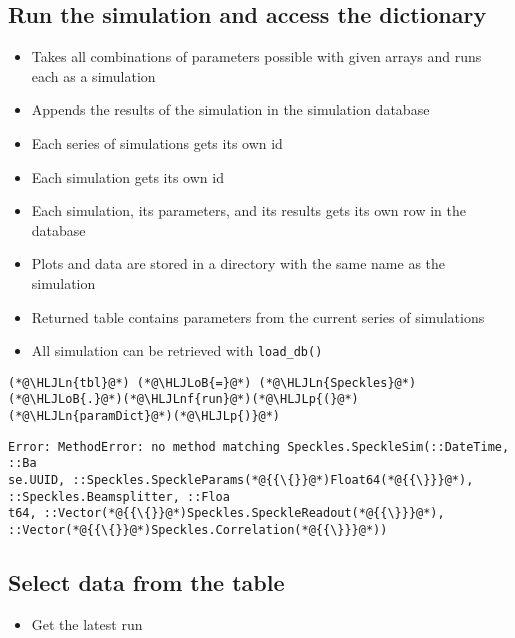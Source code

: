 \documentclass[12pt,a4paper]{article}
\newcommand{\HLJLn}[1]{#1}
\newcommand{\HLJLnf}[1]{\textcolor[RGB]{66,102,213}{#1}}
\newcommand{\HLJLoB}[1]{\textcolor[RGB]{102,102,102}{\textbf{#1}}}
\newcommand{\HLJLp}[1]{#1}
\begin{document}
\subsection{Run the simulation and access the dictionary}
\begin{itemize}
\item Takes all combinations of parameters possible with given arrays and runs each as a simulation


\item Appends the results of the simulation in the simulation database


\item Each series of simulations gets its own id


\item Each simulation gets its own id


\item Each simulation, its parameters, and its results gets its own row in the database


\item Plots and data are stored in a directory with the same name as the simulation


\item Returned table contains parameters from the current series of simulations


\item All simulation can be retrieved with \texttt{load\_db()}

\end{itemize}

\begin{lstlisting}
(*@\HLJLn{tbl}@*) (*@\HLJLoB{=}@*) (*@\HLJLn{Speckles}@*)(*@\HLJLoB{.}@*)(*@\HLJLnf{run}@*)(*@\HLJLp{(}@*)(*@\HLJLn{paramDict}@*)(*@\HLJLp{)}@*)
\end{lstlisting}

\begin{lstlisting}
Error: MethodError: no method matching Speckles.SpeckleSim(::DateTime, ::Ba
se.UUID, ::Speckles.SpeckleParams(*@{{\{}}@*)Float64(*@{{\}}}@*), ::Speckles.Beamsplitter, ::Floa
t64, ::Vector(*@{{\{}}@*)Speckles.SpeckleReadout(*@{{\}}}@*), ::Vector(*@{{\{}}@*)Speckles.Correlation(*@{{\}}}@*))
\end{lstlisting}


\subsection{Select data from the table}
\begin{itemize}
\item Get the latest run

\end{itemize}
\end{document}
